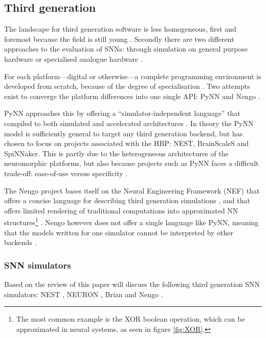 \documentclass[report.tex]{subfiles}
\begin{document}
\subsection{Third generation}
The landscape for third generation software is less homogeneous, first and
foremost because the field is still young \cite{Maass1997}.
Secondly there are two different approaches to the evaluation of \gls{SNN}s:
through simulation on general purpose hardware or specialised analogue
hardware \cite{Maass1997, Davison2009, Albada2018}.

For each platform---digital or otherwise---a complete programming environment
is developed from scratch, because of the degree of specialisation
\cite{Walter2015, Lin2018}.
Two attempts exist to converge the platform differences into one single API:
PyNN \cite{Davison2009} and Nengo \cite{Eliasmith2015}.

PyNN approaches this by offering a ``simulator-independent language''
\cite{PyNN2018} that compiled to both simulated and
accelerated architectures \cite{Davison2009}.
In theory the PyNN model is sufficiently general to target any third generation
backend, but has chosen to focus on projects associated with the
\gls{HBP}: NEST, BrainScaleS and SpiNNaker.
This is partly due to the heterogeneous architectures of the neuromorphic
platforms, but also because projects such as PyNN faces a difficult
trade-off: ease-of-use versus specificity \cite{PyNN2018}.

The Nengo project bases itself on the Neural Engineering Framework (NEF)
 that offers a concise language for
describing third generation simulations \cite{Bekolay2014}, and that
offers limited rendering of traditional computations into approximated
\gls{NN} structures\footnote{The most common example is the XOR boolean 
operation, which can be approximated in neural systems, as seen in figure
\ref{fig:XOR}.}
\cite{Eliasmith2004, Eliasmith2015}.
Nengo however does not offer a single language like PyNN, meaning
that the models written for one simulator cannot be interpreted by other
backends \cite{Nengo2018}.

\subsubsection{\Gls{SNN} simulators}
Based on the review of \textcite{Blundell2018} this paper will discuss
the following third generation \gls{SNN} simulators:
NEST \cite{Gewaltig2007}, NEURON \cite{Carnevale2007},
Brian \cite{Goodman2013} and Nengo \cite{Eliasmith2015}.
\end{document}
